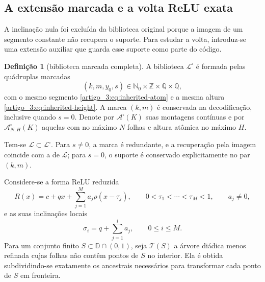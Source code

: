 \documentclass[12pt,a4paper]{article}
\theoremstyle{preciso}
\theoremstyle{definition}
\newcommand{\Nzero}{\mathbb{N}_0}
\newcommand{\Aclass}{\mathcal{A}}
\newcommand{\Library}{\mathcal{L}}
\theoremstyle{preciso}
\theoremstyle{preciso}
\theoremstyle{preciso}
\theoremstyle{preciso}
\theoremstyle{definition}
\newtheorem{definition}[teorema]{Definição}
\theoremstyle{preciso}
\theoremstyle{definition}
\theoremstyle{preciso}
\theoremstyle{preciso}
\theoremstyle{definition}
\begin{document}
\subsection{A extensão marcada e a volta ReLU exata}

A inclinação nula foi
excluída da biblioteca original porque a imagem de um segmento constante não
recupera o suporte. Para estudar a volta, introduz-se uma extensão auxiliar
que guarda esse suporte como parte do código.

\begin{definition}[biblioteca marcada completa]\label{map:artigo_3:5.1}
\label{artigo_3:def:marked-completion}
A biblioteca $\Library^\square$ é formada pelas quádruplas marcadas
\begin{equation}
 (k,m,y_0,s)\in\Nzero\times\mathbb Z\times\mathbb Q\times\mathbb Q,
 \label{artigo_3:eq:marked-atoms}
\end{equation}
com o mesmo segmento \eqref{artigo_3:eq:inherited-atom} e a mesma altura
\eqref{artigo_3:eq:inherited-height}. A marca $(k,m)$ é conservada na decodificação,
inclusive quando $s=0$. Denote por $\Aclass^\square(K)$ suas montagens
contínuas e por $\Aclass^\square_{N,H}(K)$ aquelas com no máximo $N$
folhas e altura atômica no máximo $H$.
\end{definition}

Tem-se $\Library\subset\Library^\square$. Para $s\ne0$, a marca é redundante,
e a recuperação pela imagem coincide com a de $\Library$; para $s=0$, o
suporte é conservado explicitamente no par $(k,m)$.

Considere-se a forma ReLU reduzida
\begin{equation}
 R(x)=c+qx+\sum_{j=1}^{M}a_j\rho(x-\tau_j),
 \qquad 0<\tau_1<\cdots<\tau_M<1,
 \qquad a_j\ne0,
 \label{artigo_3:eq:reduced-relu-reverse}
\end{equation}
e as suas inclinações locais
\begin{equation}
 \sigma_i=q+\sum_{j=1}^{i}a_j,
 \qquad 0\le i\le M.
 \label{artigo_3:eq:reverse-local-slopes}
\end{equation}
Para um conjunto finito $S\subset\mathbb D\cap(0,1)$, seja
$\mathcal T(S)$ a árvore diádica menos refinada cujas folhas não contêm
pontos de $S$ no interior. Ela é obtida subdividindo-se exatamente os ancestrais
necessários para transformar cada ponto de $S$ em fronteira.
\end{document}

